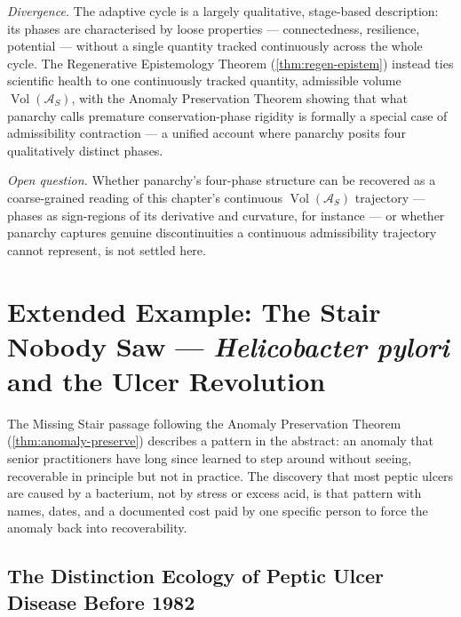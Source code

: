 \documentclass[12pt,twoside,openright]{book}
\newcommand{\adm}{\mathcal{A}}
\newcommand{\Vol}{\operatorname{Vol}}
\begin{document}
\emph{Divergence.} The adaptive cycle is a largely qualitative,
stage-based description: its phases are characterised by loose
properties --- connectedness, resilience, potential --- without a
single quantity tracked continuously across the whole cycle. The
Regenerative Epistemology Theorem (\cref{thm:regen-epistem})
instead ties scientific health to one continuously tracked
quantity, admissible volume $\Vol(\adm_S)$, with the Anomaly
Preservation Theorem showing that what panarchy calls premature
conservation-phase rigidity is formally a special case of
admissibility contraction --- a unified account where panarchy
posits four qualitatively distinct phases.

\emph{Open question.} Whether panarchy's four-phase structure can
be recovered as a coarse-grained reading of this chapter's
continuous $\Vol(\adm_S)$ trajectory --- phases as sign-regions of
its derivative and curvature, for instance --- or whether panarchy
captures genuine discontinuities a continuous admissibility
trajectory cannot represent, is not settled here.


\section{Extended Example: The Stair Nobody Saw ---
\emph{Helicobacter pylori} and the Ulcer Revolution}
\label{sec:ch29-hpylori}

The Missing Stair passage following the Anomaly Preservation
Theorem (\cref{thm:anomaly-preserve}) describes a pattern in the
abstract: an anomaly that senior practitioners have long since
learned to step around without seeing, recoverable in principle
but not in practice. The discovery that most peptic ulcers are
caused by a bacterium, not by stress or excess acid, is that
pattern with names, dates, and a documented cost paid by one
specific person to force the anomaly back into recoverability.

\subsection{The Distinction Ecology of Peptic Ulcer Disease Before 1982}
\end{document}
